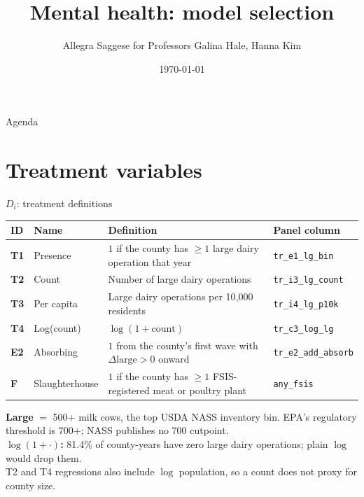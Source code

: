 \documentclass[aspectratio=169]{beamer}
\title{Mental health: model selection}
\author{Allegra Saggese for Professors Galina Hale, Hanna Kim}
\date{\today}
\begin{document}
\begin{frame}\titlepage\end{frame}

\begin{frame}{Agenda}
\tableofcontents
\end{frame}



\section{Treatment variables}

\begin{frame}{$D_i$: treatment definitions}
\vspace{-8pt}
\begin{center}\scriptsize
\begin{tabular}{@{}llp{6.6cm}l@{}}
\toprule
ID & Name & Definition & Panel column \\
\midrule
\textbf{T1} & Presence & $1$ if the county has $\geq 1$ large dairy operation that year & \texttt{tr\_e1\_lg\_bin} \\[0.2em]
\textbf{T2} & Count & Number of large dairy operations & \texttt{tr\_i3\_lg\_count} \\[0.2em]
\textbf{T3} & Per capita & Large dairy operations per 10{,}000 residents & \texttt{tr\_i4\_lg\_p10k} \\[0.2em]
\textbf{T4} & Log(count) & $\log(1+\text{count})$ & \texttt{tr\_c3\_log\_lg} \\[0.2em]
\textbf{E2} & Absorbing & $1$ from the county's first wave with $\Delta\text{large}>0$ onward & \texttt{tr\_e2\_add\_absorb} \\[0.2em]
\textbf{F} & Slaughterhouse & $1$ if the county has $\geq 1$ FSIS-registered meat or poultry plant & \texttt{any\_fsis} \\
\bottomrule
\end{tabular}
\end{center}
\vspace{0.1em}
{\scriptsize
\textbf{Large} $=$ 500$+$ milk cows, the top USDA NASS inventory bin. EPA's regulatory threshold is 700$+$; NASS publishes no 700 cutpoint.\\[0.2em]
\textbf{$\log(1+\cdot)$:} 81.4\% of county-years have zero large dairy operations; plain $\log$ would drop them.\\[0.2em]
T2 and T4 regressions also include $\log$ population, so a count does not proxy for county size.}
\end{frame}
\end{document}
